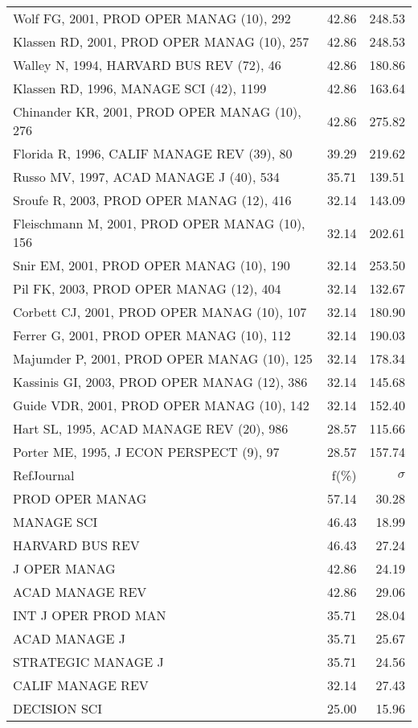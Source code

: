 \documentclass[a4paper,11pt]{report}
\begin{document}
\begin{landscape}
\begin{table}[!ht]
{\begin{tabular}{|l r r|}
Wolf FG, 2001, PROD OPER MANAG (10), 292 & 42.86 & 248.53\\
Klassen RD, 2001, PROD OPER MANAG (10), 257 & 42.86 & 248.53\\
Walley N, 1994, HARVARD BUS REV (72), 46 & 42.86 & 180.86\\
Klassen RD, 1996, MANAGE SCI (42), 1199 & 42.86 & 163.64\\
Chinander KR, 2001, PROD OPER MANAG (10), 276 & 42.86 & 275.82\\
Florida R, 1996, CALIF MANAGE REV (39), 80 & 39.29 & 219.62\\
Russo MV, 1997, ACAD MANAGE J (40), 534 & 35.71 & 139.51\\
Sroufe R, 2003, PROD OPER MANAG (12), 416 & 32.14 & 143.09\\
Fleischmann M, 2001, PROD OPER MANAG (10), 156 & 32.14 & 202.61\\
Snir EM, 2001, PROD OPER MANAG (10), 190 & 32.14 & 253.50\\
Pil FK, 2003, PROD OPER MANAG (12), 404 & 32.14 & 132.67\\
Corbett CJ, 2001, PROD OPER MANAG (10), 107 & 32.14 & 180.90\\
Ferrer G, 2001, PROD OPER MANAG (10), 112 & 32.14 & 190.03\\
Majumder P, 2001, PROD OPER MANAG (10), 125 & 32.14 & 178.34\\
Kassinis GI, 2003, PROD OPER MANAG (12), 386 & 32.14 & 145.68\\
Guide VDR, 2001, PROD OPER MANAG (10), 142 & 32.14 & 152.40\\
Hart SL, 1995, ACAD MANAGE REV (20), 986 & 28.57 & 115.66\\
Porter ME, 1995, J ECON PERSPECT (9), 97 & 28.57 & 157.74\\
\hline
\hline
RefJournal & f(\%) & $\sigma$\\
\hline
PROD OPER MANAG & 57.14 & 30.28\\
MANAGE SCI & 46.43 & 18.99\\
HARVARD BUS REV & 46.43 & 27.24\\
J OPER MANAG & 42.86 & 24.19\\
ACAD MANAGE REV & 42.86 & 29.06\\
INT J OPER PROD MAN & 35.71 & 28.04\\
ACAD MANAGE J & 35.71 & 25.67\\
STRATEGIC MANAGE J & 35.71 & 24.56\\
CALIF MANAGE REV & 32.14 & 27.43\\
DECISION SCI & 25.00 & 15.96\\
\hline
\end{tabular}
}
\end{table}


\end{landscape}
\end{document}
